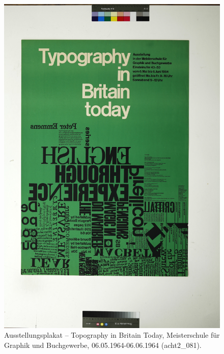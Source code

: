 \documentclass[a4paper,12pt,ngerman]{article}
\begin{document}
\newpage
\begin{figure}[ht]
\includegraphics[width=\linewidth]{Abbildung_16_(acht2_081)}
\centering
\caption{Ausstellungsplakat -- Topography in Britain Today, Meisterschule für Graphik und Buchgewerbe, 06.05.1964-06.06.1964 (acht2\_081).}
\end{figure}
\end{document}
